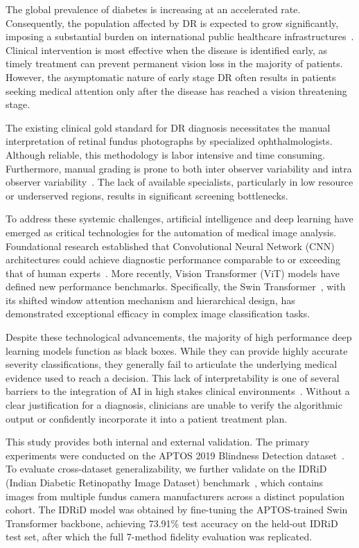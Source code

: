 \documentclass[10pt,twoside]{article}
\begin{document}
The global prevalence of diabetes is increasing at an accelerated rate. Consequently, the population affected by DR is expected to grow significantly, imposing a substantial burden on international public healthcare infrastructures~\cite{teo2021global}. Clinical intervention is most effective when the disease is identified early, as timely treatment can prevent permanent vision loss in the majority of patients. However, the asymptomatic nature of early stage DR often results in patients seeking medical attention only after the disease has reached a vision threatening stage.

The existing clinical gold standard for DR diagnosis necessitates the manual interpretation of retinal fundus photographs by specialized ophthalmologists. Although reliable, this methodology is labor intensive and time consuming. Furthermore, manual grading is prone to both inter observer variability and intra observer variability~\cite{krause2018grader}. The lack of available specialists, particularly in low resource or underserved regions, results in significant screening bottlenecks.

To address these systemic challenges, artificial intelligence and deep learning have emerged as critical technologies for the automation of medical image analysis. Foundational research established that Convolutional Neural Network (CNN) architectures could achieve diagnostic performance comparable to or exceeding that of human experts~\cite{gulshan2016development}. More recently, Vision Transformer (ViT) models have defined new performance benchmarks. Specifically, the Swin Transformer~\cite{liu2021swin}, with its shifted window attention mechanism and hierarchical design, has demonstrated exceptional efficacy in complex image classification tasks.

Despite these technological advancements, the majority of high performance deep learning models function as black boxes. While they can provide highly accurate severity classifications, they generally fail to articulate the underlying medical evidence used to reach a decision. This lack of interpretability is one of several barriers to the integration of AI in high stakes clinical environments~\cite{kelly2019key}. Without a clear justification for a diagnosis, clinicians are unable to verify the algorithmic output or confidently incorporate it into a patient treatment plan.

This study provides both internal and external validation. The primary experiments were conducted on the APTOS 2019 Blindness Detection dataset~\cite{aptos2019kaggle}. To evaluate cross-dataset generalizability, we further validate on the IDRiD (Indian Diabetic Retinopathy Image Dataset) benchmark~\cite{porwal2018idrid}, which contains images from multiple fundus camera manufacturers across a distinct population cohort. The IDRiD model was obtained by fine-tuning the APTOS-trained Swin Transformer backbone, achieving 73.91\% test accuracy on the held-out IDRiD test set, after which the full 7-method fidelity evaluation was replicated.
\end{document}

